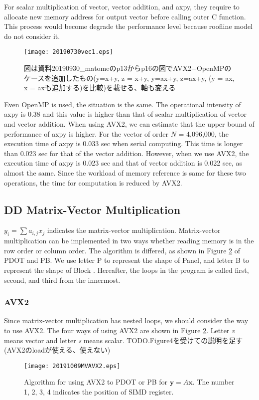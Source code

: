 \documentclass{IOS-Book-Article}
\begin{document}
For scalar multiplication of vector, vector addition, and axpy, they require to allocate new memory address for output vector before calling outer C function. This process would become degrade the performance level because roofline model do not consider it.
\begin{figure}[htbp]
  \begin{center}
    \texttt{[image: 20190730vec1.eps]}
    \caption{図は資料20190930\_matomeのp13からp16の図でAVX2+OpenMPのケースを追加したもの(y=x+y, z = x+y, y=ax+y, z=ax+y, (y = ax, x = axも追加する)を比較)を載せる、軸も変える}
    \label{xd}
  \end{center}
\end{figure}

Even OpenMP is used, the situation is the same. The operational intensity of axpy is 0.38 and this value is higher than that of scalar multiplication of vector and vector addition. When using AVX2, we can estimate that the upper bound of performance of axpy is higher. For the vector of order $N$ = 4,096,000, the execution time of axpy is 0.033 sec when serial computing. This time is longer than 0.023 sec for that of the vector addition. However, when we use AVX2, the execution time of axpy is 0.023 sec and that of vector addition is 0.022 sec, as almost the same. Since the workload of memory reference is same for these two operations, the time for computation is reduced by AVX2.



\subsection{DD Matrix-Vector Multiplication}
$y_{i} = \sum a_{i,j}x_{j}$ indicates the matrix-vector multiplication. 
Matrix-vector multiplication can be implemented in two ways whether reading memory is in the row order or column order. The algorithm is differed, as shown in Figure \ref{figimpAVX} of PDOT and PB. We use letter P to represent the shape of Panel, and letter B to represent the shape of Block \cite{goto}. Hereafter, the loops in the program is called first, second, and third from the innermost.
\subsubsection{AVX2}
Since matrix-vector multiplication has nested loops, we should consider the way to use AVX2. The four ways of using AVX2 are shown in Figure \ref{figimpAVX}. Letter {\it v} means vector and letter {\it s} means scalar. 
TODO.Figure4を受けての説明を足す(AVX2のloadが使える、使えない)
\begin{figure}[htbp]
  \begin{center}
    \texttt{[image: 20191009MVAVX2.eps]}
    \caption{Algorithm for using AVX2 to PDOT or PB for $\bm{y} = A\bm{x}$. The number 1, 2, 3, 4 indicates the position of SIMD register. }
    \label{figimpAVX}
  \end{center}
\end{figure}
\end{document}
